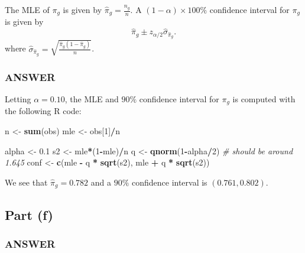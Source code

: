 \documentclass[
]{article}
\newenvironment{Shaded}{\begin{snugshade}}{\end{snugshade}}
\newcommand{\CommentTok}[1]{\textcolor[rgb]{0.56,0.35,0.01}{\textit{#1}}}
\newcommand{\DecValTok}[1]{\textcolor[rgb]{0.00,0.00,0.81}{#1}}
\newcommand{\FloatTok}[1]{\textcolor[rgb]{0.00,0.00,0.81}{#1}}
\newcommand{\FunctionTok}[1]{\textcolor[rgb]{0.13,0.29,0.53}{\textbf{#1}}}
\newcommand{\NormalTok}[1]{#1}
\newcommand{\OtherTok}[1]{\textcolor[rgb]{0.56,0.35,0.01}{#1}}
\newcommand{\SpecialCharTok}[1]{\textcolor[rgb]{0.81,0.36,0.00}{\textbf{#1}}}
\begin{document}

The MLE of \(\pi_g\) is given by \(\hat{\pi}_g = \frac{n_g}{n}\). A
\((1-\alpha) \times 100 \%\) confidence interval for \(\pi_g\) is given
by \[
  \hat{\pi}_g \pm z_{\alpha/2} \hat\sigma_{\hat\pi_g}.
\] where
\(\hat\sigma_{\hat\pi_g} = \sqrt{\frac{\hat{\pi}_g (1-\hat{\pi}_g)}{n}}\).

\hypertarget{answer-4}{%
\subsubsection{ANSWER}\label{answer-4}}

Letting \(\alpha = 0.10\), the MLE and \(90\%\) confidence interval for
\(\pi_g\) is computed with the following R code:

\begin{Shaded}
\begin{Highlighting}[]
\NormalTok{n }\OtherTok{\textless{}{-}} \FunctionTok{sum}\NormalTok{(obs)}
\NormalTok{mle }\OtherTok{\textless{}{-}}\NormalTok{ obs[}\DecValTok{1}\NormalTok{]}\SpecialCharTok{/}\NormalTok{n}

\NormalTok{alpha }\OtherTok{\textless{}{-}} \FloatTok{0.1}
\NormalTok{s2 }\OtherTok{\textless{}{-}}\NormalTok{ mle}\SpecialCharTok{*}\NormalTok{(}\DecValTok{1}\SpecialCharTok{{-}}\NormalTok{mle)}\SpecialCharTok{/}\NormalTok{n}
\NormalTok{q }\OtherTok{\textless{}{-}} \FunctionTok{qnorm}\NormalTok{(}\DecValTok{1}\SpecialCharTok{{-}}\NormalTok{alpha}\SpecialCharTok{/}\DecValTok{2}\NormalTok{)  }\CommentTok{\# should be around 1.645}
\NormalTok{conf }\OtherTok{\textless{}{-}} \FunctionTok{c}\NormalTok{(mle }\SpecialCharTok{{-}}\NormalTok{ q }\SpecialCharTok{*} \FunctionTok{sqrt}\NormalTok{(s2),}
\NormalTok{          mle }\SpecialCharTok{+}\NormalTok{ q }\SpecialCharTok{*} \FunctionTok{sqrt}\NormalTok{(s2))}
\end{Highlighting}
\end{Shaded}

We see that \(\hat{\pi}_g = 0.782\) and a \(90\%\) confidence interval
is \((0.761, 0.802)\).

\hypertarget{part-f}{%
\subsection{Part (f)}\label{part-f}}


\hypertarget{answer-5}{%
\subsubsection{ANSWER}\label{answer-5}}
\end{document}

